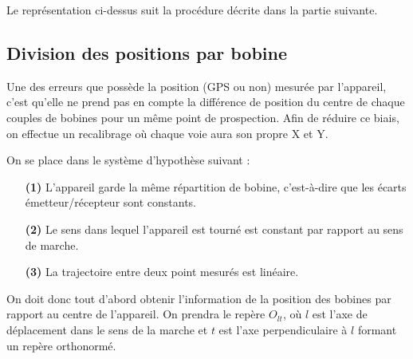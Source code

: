 \documentclass[12pt]{article}
\begin{document}
    Le représentation ci-dessus suit la procédure décrite dans la partie suivante.

\newpage
\subsection{Division des positions par bobine} \label{2-divpos}

    Une des erreurs que possède la position (GPS ou non) mesurée par l'appareil, c'est qu'elle ne prend pas en compte la différence de position du centre de chaque couples de bobines pour un même point de prospection. Afin de réduire ce biais, on effectue un recalibrage où chaque voie aura son propre X et Y.

    On se place dans le système d'hypothèse suivant :

    \begin{enumerate}
        \item[\textbf{(1)}] L'appareil garde la même répartition de bobine, c'est-à-dire que les écarts émetteur/récepteur sont constants.
        \item[\textbf{(2)}] Le sens dans lequel l'appareil est tourné est constant par rapport au sens de marche.
        \item[\textbf{(3)}] La trajectoire entre deux point mesurés est linéaire.
    \end{enumerate}

    On doit donc tout d'abord obtenir l'information de la position des bobines par rapport au centre de l'appareil. On prendra le repère $O_{lt}$, où $l$ est l'axe de déplacement dans le sens de la marche et $t$ est l'axe perpendiculaire à $l$ formant un repère orthonormé.
\end{document}
